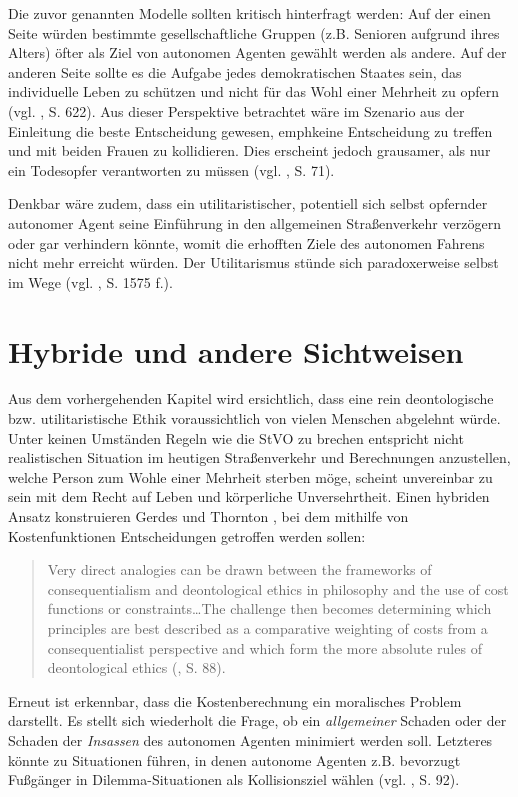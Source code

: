 \documentclass[a4paper, 12pt, titlepage]{scrartcl}
\begin{document}
	Die zuvor genannten Modelle sollten kritisch hinterfragt werden: Auf der einen Seite w\"urden bestimmte gesellschaftliche Gruppen (z.B. Senioren aufgrund ihres Alters) \"ofter als \glqq Ziel\grqq{} von autonomen Agenten gew\"ahlt werden als andere. Auf der anderen Seite sollte es die Aufgabe jedes demokratischen Staates sein, das individuelle Leben zu sch\"utzen und nicht f\"ur das Wohl einer Mehrheit zu opfern (vgl. \autocite{Hevelke2015}, S. 622). Aus dieser Perspektive betrachtet w\"are im Szenario aus der Einleitung die beste Entscheidung gewesen, emph{keine} Entscheidung zu treffen und mit beiden Frauen zu kollidieren. Dies erscheint jedoch grausamer, als nur ein Todesopfer verantworten zu m\"ussen (vgl. \autocite{Lin2015}, S. 71).
	
	Denkbar w\"are zudem, dass ein utilitaristischer, potentiell sich selbst opfernder autonomer Agent seine Einf\"uhrung in den allgemeinen Stra\ss enverkehr verz\"ogern oder gar verhindern k\"onnte, womit die erhofften Ziele des autonomen Fahrens nicht mehr erreicht w\"urden. Der Utilitarismus st\"unde sich paradoxerweise selbst im Wege (vgl. \autocite{Bonnefon1573}, S. 1575 f.).
\section{Hybride und andere Sichtweisen}
	Aus dem vorhergehenden Kapitel wird ersichtlich, dass eine rein deontologische bzw. utilitaristische Ethik voraussichtlich von vielen Menschen abgelehnt w\"urde. Unter keinen Umst\"anden Regeln wie die StVO zu brechen entspricht nicht realistischen Situation im heutigen Stra\ss enverkehr und Berechnungen anzustellen, welche Person zum Wohle einer Mehrheit sterben m\"oge, scheint unvereinbar zu sein mit dem Recht auf Leben und k\"orperliche Unversehrtheit. Einen hybriden Ansatz konstruieren Gerdes und Thornton \autocite{Gerdes2015}, bei dem mithilfe von Kostenfunktionen Entscheidungen getroffen werden sollen:
	\begin{quote}
		\glqq Very direct analogies can be drawn between the frameworks of consequentialism and deontological ethics in philosophy and the use of cost functions or constraints\dots The challenge then becomes determining which principles are best described as a comparative weighting of costs from a consequentialist perspective and which form the more absolute rules of deontological ethics\grqq{} (\autocite{Gerdes2015}, S. 88).
	\end{quote}
	Erneut ist erkennbar, dass die Kostenberechnung ein moralisches Problem darstellt. Es stellt sich wiederholt die Frage, ob ein \emph{allgemeiner} Schaden oder der Schaden der \emph{Insassen} des autonomen Agenten minimiert werden soll. Letzteres k\"onnte zu Situationen f\"uhren, in denen autonome Agenten z.B. bevorzugt Fu\ss g\"anger in Dilemma-Situationen als Kollisionsziel w\"ahlen (vgl. \autocite{Gerdes2015}, S. 92). 
	
\end{document}
